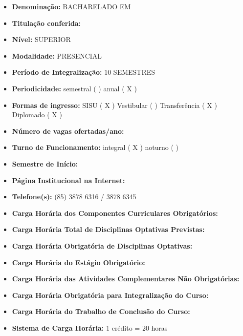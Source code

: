 \documentclass{paper}
\def\web#1{\href{#1}{#1}}
\begin{document}
\begin{itemize}
\item \textbf{Denominação:} \MakeUppercase{Bacharelado em \NOMEENG}
\item \textbf{Titulação conferida:} \MakeUppercase{\NOMEEGRESSO}
\item \textbf{Nível:} \MakeUppercase{SUPERIOR}
\item \textbf{Modalidade:} \MakeUppercase{PRESENCIAL}
\item \textbf{Período de Integralização:} \MakeUppercase{10 semestres}
\item \textbf{Periodicidade: }{semestral (  )  anual ( X ) }
\item \textbf{Formas de ingresso: }{SISU ( X )  Vestibular (  ) Transferência ( X ) Diplomado ( X ) }
\item \textbf{Número de vagas ofertadas/ano: }{\NUMVAGAS}
\item \textbf{Turno de Funcionamento: }{integral ( X ) noturno ( )}
\item \textbf{Semestre de Início:} \MakeUppercase{\SEMESTRE}
\item\textbf{Página Institucional na Internet:} 

\web{\PAGINA}
\item\textbf{Telefone(s):} (85) 3878 6316 / 3878 6345
\item \textbf{Carga Horária dos Componentes Curriculares Obrigatórios: }{\CHTOTALDOB}
\item \textbf{Carga Horária Total de Disciplinas Optativas Previstas: }{\CHOPT}
\item \textbf{Carga Horária Obrigatória de Disciplinas Optativas: }{\CHOPTMIN}
\item \textbf{Carga Horária do Estágio Obrigatório: }{\CHESTAGIO}
\item \textbf{Carga Horária das Atividades Complementares Não Obrigatórias: }{\CHCOMP}
\item \textbf{Carga Horária Obrigatória para Integralização do Curso: }{\CHTOTALOB}
\item \textbf{Carga Horária do Trabalho de Conclusão do Curso: }{\CHTCC}
\item \textbf{Sistema de Carga Horária: }{1 crédito = 20 horas}
\end{itemize}

\end{document}
